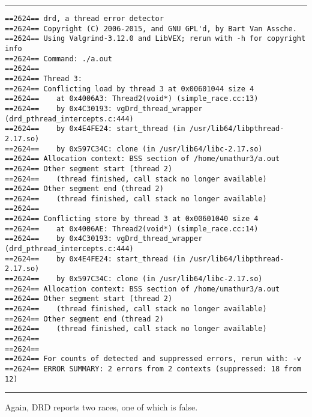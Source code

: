 \vspace{0.5cm}
\hrule
{\small
\begin{verbatim}
==2624== drd, a thread error detector
==2624== Copyright (C) 2006-2015, and GNU GPL'd, by Bart Van Assche.
==2624== Using Valgrind-3.12.0 and LibVEX; rerun with -h for copyright info
==2624== Command: ./a.out
==2624== 
==2624== Thread 3:
==2624== Conflicting load by thread 3 at 0x00601044 size 4
==2624==    at 0x4006A3: Thread2(void*) (simple_race.cc:13)
==2624==    by 0x4C30193: vgDrd_thread_wrapper (drd_pthread_intercepts.c:444)
==2624==    by 0x4E4FE24: start_thread (in /usr/lib64/libpthread-2.17.so)
==2624==    by 0x597C34C: clone (in /usr/lib64/libc-2.17.so)
==2624== Allocation context: BSS section of /home/umathur3/a.out
==2624== Other segment start (thread 2)
==2624==    (thread finished, call stack no longer available)
==2624== Other segment end (thread 2)
==2624==    (thread finished, call stack no longer available)
==2624== 
==2624== Conflicting store by thread 3 at 0x00601040 size 4
==2624==    at 0x4006AE: Thread2(void*) (simple_race.cc:14)
==2624==    by 0x4C30193: vgDrd_thread_wrapper (drd_pthread_intercepts.c:444)
==2624==    by 0x4E4FE24: start_thread (in /usr/lib64/libpthread-2.17.so)
==2624==    by 0x597C34C: clone (in /usr/lib64/libc-2.17.so)
==2624== Allocation context: BSS section of /home/umathur3/a.out
==2624== Other segment start (thread 2)
==2624==    (thread finished, call stack no longer available)
==2624== Other segment end (thread 2)
==2624==    (thread finished, call stack no longer available)
==2624== 
==2624== 
==2624== For counts of detected and suppressed errors, rerun with: -v
==2624== ERROR SUMMARY: 2 errors from 2 contexts (suppressed: 18 from 12)
\end{verbatim}
}

\hrule
\vspace{0.5cm}
Again, DRD reports two races, one of which is false.